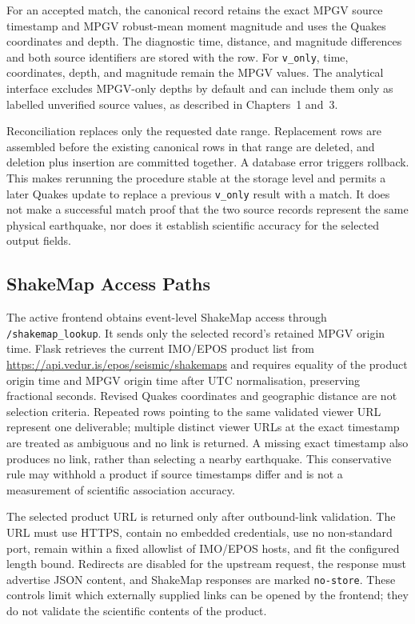 \documentclass[12pt]{article}
\begin{document}
For an accepted match, the canonical record retains the exact MPGV source timestamp and MPGV robust-mean moment magnitude and uses the Quakes coordinates and depth. The diagnostic time, distance, and magnitude differences and both source identifiers are stored with the row. For \texttt{v\_only}, time, coordinates, depth, and magnitude remain the MPGV values. The analytical interface excludes MPGV-only depths by default and can include them only as labelled unverified source values, as described in Chapters~1 and~3.

Reconciliation replaces only the requested date range. Replacement rows are assembled before the existing canonical rows in that range are deleted, and deletion plus insertion are committed together. A database error triggers rollback. This makes rerunning the procedure stable at the storage level and permits a later Quakes update to replace a previous \texttt{v\_only} result with a match. It does not make a successful match proof that the two source records represent the same physical earthquake, nor does it establish scientific accuracy for the selected output fields.

\subsection{ShakeMap Access Paths}
\label{subsec:shakemap}

The active frontend obtains event-level ShakeMap access through \texttt{/shakemap\_lookup}. It sends only the selected record's retained MPGV origin time. Flask retrieves the current IMO/EPOS product list from \url{https://api.vedur.is/epos/seismic/shakemaps} and requires equality of the product origin time and MPGV origin time after UTC normalisation, preserving fractional seconds. Revised Quakes coordinates and geographic distance are not selection criteria. Repeated rows pointing to the same validated viewer URL represent one deliverable; multiple distinct viewer URLs at the exact timestamp are treated as ambiguous and no link is returned. A missing exact timestamp also produces no link, rather than selecting a nearby earthquake. This conservative rule may withhold a product if source timestamps differ and is not a measurement of scientific association accuracy.

The selected product URL is returned only after outbound-link validation. The URL must use HTTPS, contain no embedded credentials, use no non-standard port, remain within a fixed allowlist of IMO/EPOS hosts, and fit the configured length bound. Redirects are disabled for the upstream request, the response must advertise JSON content, and ShakeMap responses are marked \texttt{no-store}. These controls limit which externally supplied links can be opened by the frontend; they do not validate the scientific contents of the product.
\end{document}
